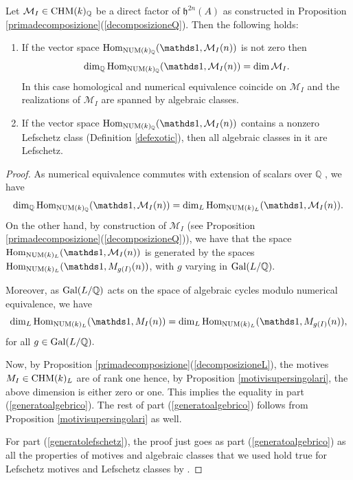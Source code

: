 \documentclass[11pt]{amsart}
\begin{document}
\begin{proposition}\label{talvez}
Let  $\mathcal{M}_I \in \mathrm{CHM} (k)_{\mathbb{Q}}$ be a  direct factor of $\mathfrak{h}^{2n}(A)$ as constructed in Proposition \ref{primadecomposizione}(\ref{decomposizioneQ}). Then the following holds:
\begin{enumerate}
\item\label{generatoalgebrico} If the vector space $\Hom_{\NUM(k)_\Q}(\one, \mathcal{M}_I (n))$ is not zero then 
\[\dim_\Q \Hom_{\NUM(k)_\Q}(\one, \mathcal{M}_I (n)) = \dim \mathcal{M}_I.\]
In this case homological and numerical equivalence coincide on $ \mathcal{M}_I$ and the realizations of $ \mathcal{M}_I$ are spanned by algebraic classes.
\item\label{generatolefschetz}   If the vector space $\Hom_{\NUM(k)_\Q}(\one, \mathcal{M}_I (n))$ contains a nonzero Lefschetz class (Definition \ref{defexotic}), then all algebraic  classes in 
it are Lefschetz.
\end{enumerate}
\end{proposition}
\begin{proof}
As numerical equivalence commutes with  extension of scalars over $\mathbb{Q}$ \cite[Proposition 3.2.7.1]{Andmot}, we have \[\dim_\Q \Hom_{\NUM(k)_\Q}(\one, \mathcal{M}_I (n)) = \dim_L \Hom_{\NUM(k)_L}(\one, \mathcal{M}_I (n)).\]
 On the other hand, by construction of $\mathcal{M}_I$ (see Proposition \ref{primadecomposizione}(\ref{decomposizioneQ})), we have that the space $\Hom_{\NUM(k)_L}(\one,\mathcal{M}_I(n))$ is generated by the spaces $\Hom_{\NUM(k)_L}(\one,M_{g(I)}(n))$, with $g$ varying in $\textnormal{Gal}(L/\mathbb{Q}).$

 Moreover, as $\textnormal{Gal}(L/\mathbb{Q})$  acts on the space of algebraic cycles modulo numerical equivalence, we have 
 \[\dim_L \Hom_{\NUM(k)_L}(\one,M_{I}(n)) = \dim_L \Hom_{\NUM(k)_L}(\one,M_{g(I)}(n)),\] for all $g\in \textnormal{Gal}(L/\mathbb{Q}).$
 
 Now, by Proposition \ref{primadecomposizione}(\ref{decomposizioneL}), the motives $M_{I} \in \mathrm{CHM} (k)_{L}$ are of rank one hence, by Proposition \ref{motivisupersingolari}, the above  dimension is either zero or one. This implies the equality in part (\ref{generatoalgebrico}). The rest of part (\ref{generatoalgebrico}) follows from Proposition \ref{motivisupersingolari} as well. 
 
 
 For part (\ref{generatolefschetz}), the proof just goes as part (\ref{generatoalgebrico}) as all the properties of motives and algebraic classes that we used hold true for Lefschetz motives and Lefschetz classes by   \cite[p. 640]{Milnelef}.
\end{proof}
\end{document}
